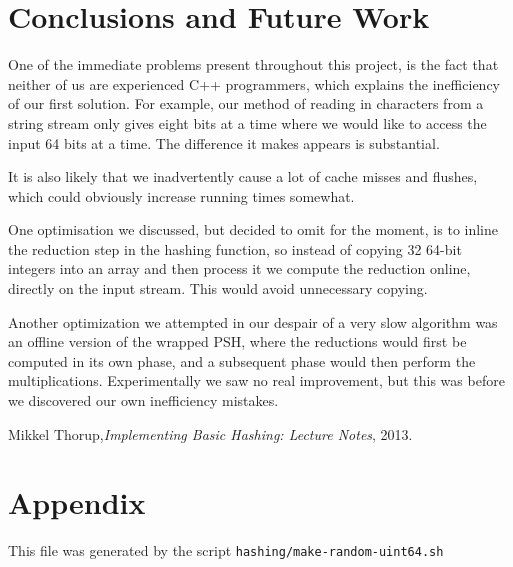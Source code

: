 \documentclass[]{article}
\newcommand{\funk}[1]{\texttt{\small #1}}
\newcommand{\cpp}{C+\!+\xspace}
\newcommand{\includecode}[2][C]{}
\begin{document}
\section{Conclusions and Future Work}

One of the immediate problems present throughout this project, is the fact that neither of us are experienced \cpp programmers, which explains the inefficiency of our first solution. For example, our method of reading in characters from a string stream only gives eight bits at a time where we would like to access the input 64 bits at a time. The difference it makes appears is substantial.

It is also likely that we inadvertently cause a lot of cache misses and flushes, which could obviously increase running times somewhat.

One optimisation we discussed, but decided to omit for the moment, is to inline the reduction step in the hashing function, so instead of copying 32 64-bit integers into an array and then process it we compute the reduction online, directly on the input stream. This would avoid unnecessary copying.

Another optimization we attempted in our despair of a very slow algorithm was an offline version of the wrapped PSH, where the reductions would first be computed in its own phase, and a subsequent phase would then perform the multiplications. Experimentally we saw no real improvement, but this was before we discovered our own inefficiency mistakes.



\begin{thebibliography}{2}
Mikkel Thorup,\emph{Implementing Basic Hashing: Lecture Notes}, 2013.
\end{thebibliography}

\section*{Appendix}

\lstlistoflistings
\newpage
\includecode{hashing/hotbox.cpp}
\includecode{hashing/std.ipp}
\newpage
\includecode{hashing/dshash.ipp}
\newpage

\newpage
This file was generated by the script \funk{hashing/make-random-uint64.sh}
\includecode{hashing/random-numbers-uint64.hpp}
\end{document}
